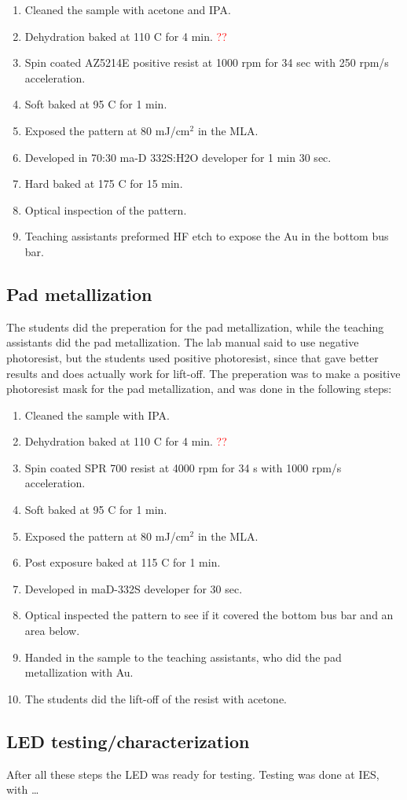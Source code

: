 \begin{enumerate}
    \item Cleaned the sample with acetone and IPA.
    \item Dehydration baked at 110 \textdegree C for 4 min. \textcolor{red}{??}
    \item Spin coated AZ5214E positive resist at 1000 rpm for 34 sec with 250 rpm/s acceleration.
    \item Soft baked at 95 \textdegree C for 1 min.
    \item Exposed the pattern at 80 mJ/cm$^2$ in the MLA.
    \item Developed in 70:30 ma-D 332S:H2O developer for 1 min 30 sec.
    \item Hard baked at 175 \textdegree C for 15 min.
    \item Optical inspection of the pattern.
    \item Teaching assistants preformed HF etch to expose the Au in the bottom bus bar.
\end{enumerate}



\subsection{Pad metallization}
\label{methods:pad_metallization}

The students did the preperation for the pad metallization, while the teaching assistants did the pad metallization.
The lab manual said to use negative photoresist, but the students used positive photoresist, since that gave better results and does actually work for lift-off. %
The preperation was to make a positive photoresist mask for the pad metallization, and was done in the following steps:
\begin{enumerate}
    \item Cleaned the sample with IPA.
    \item Dehydration baked at 110 \textdegree C for 4 min. \textcolor{red}{??}
    \item Spin coated SPR 700 resist at 4000 rpm for 34 s with 1000 rpm/s acceleration.
    \item Soft baked at 95 \textdegree C for 1 min.
    \item Exposed the pattern at 80 mJ/cm$^2$ in the MLA.
    \item Post exposure baked at 115 \textdegree C for 1 min.
    \item Developed in maD-332S developer for 30 sec.
    \item Optical inspected the pattern to see if it covered the bottom bus bar and an area below.
    \item Handed in the sample to the teaching assistants, who did the pad metallization with Au.
    \item The students did the lift-off of the resist with acetone.
\end{enumerate}


\subsection{LED testing/characterization}
\label{methods:LED_testing}
After all these steps the LED was ready for testing.
Testing was done at IES, with \dots

